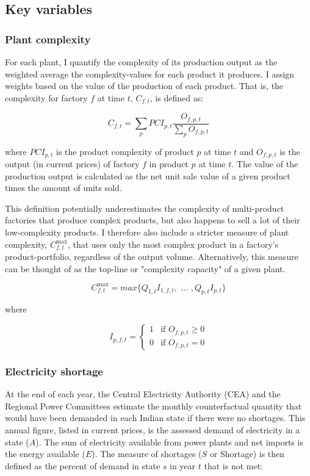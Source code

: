 \documentclass[11pt]{article}
\begin{document}
\subsection{Key variables}%
\label{sub:key_variables}

\subsubsection{Plant complexity}%
\label{sub:plant_complexity}

For each plant, I quantify the complexity of its production output as the weighted average the complexity-values for each product it produces. I assign weights based on the value of the production of each product. That is, the complexity for factory \(f\) at time \(t\), \(C_{f,t}\), is defined as:

\[
C_{f,t} = \sum_p PCI_{p,t} \frac{O_{f,p,t}}{\sum_p O_{f,p,t}}
\] 

where \(PCI_{p,t}\) is the product complexity of product \(p\) at time \(t\) and \(O_{f,p,t}\) is the output (in current prices) of factory \(f\) in product \(p\) at time \(t\). The value of the production output is calculated as the net unit sale value of a given product times the amount of units sold. 

This definition potentially underestimates the complexity of multi-product factories that produce complex products, but also happens to sell a lot of their low-complexity products. I therefore also include a stricter measure of plant complexity, \(C^{\text{max}}_{f,t}\), that uses only the most complex product in a factory's product-portfolio, regardless of the output volume. Alternatively, this measure can be thought of as the top-line or "complexity capacity" of a given plant. 

\[
C^{\text{max}}_{f,t} = max \{ Q_{1,t} I_{1,f,t}, \text{ ... }, Q_{p,t} I_{p,t} \}
\]

where

\[
I_{p,f,t} = \begin{cases}
 1 & \text{if } O_{f,p,t} \geq 0 \\
 0 & \text{if } O_{f,p,t} = 0
\end{cases}
\]

\subsubsection{Electricity shortage}%
\label{sub:shortage}

At the end of each year, the Central Electricity Authority (CEA) and the Regional Power Committees estimate the monthly counterfactual quantity that would have been demanded in each Indian state if there were no shortages. This annual figure, listed in current prices, is the assessed demand of electricity in a state (\(A\)). The sum of electricity available from power plants and net imports is the energy available ($E$). The measure of shortages (\(S\) or Shortage) is then defined as the percent of demand in state \(s\) in year \(t\) that is not met:
\end{document}
